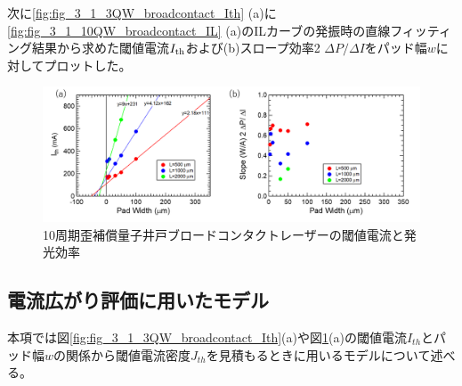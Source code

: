 次に\ref{fig:fig_3_1_3QW_broadcontact_Ith} (a)に\ref{fig:fig_3_1_10QW_broadcontact_IL} (a)のILカーブの発振時の直線フィッティング結果から求めた閾値電流$I_{\rm{th}}$および(b)スロープ効率2 $\Delta P/\Delta I$をパッド幅$w$に対してプロットした。
\begin{figure}[h]
	\centering
	\includegraphics[width=15cm]{figure/fig_3_1_10QW_broadcontact_Ith.png}
		\caption{10周期歪補償量子井戸ブロードコンタクトレーザーの閾値電流と発光効率}
		\label{fig:fig_3_1_10QW_broadcontact_Ith}
\end{figure}
\subsection{電流広がり評価に用いたモデル}%
本項では図\ref{fig:fig_3_1_3QW_broadcontact_Ith}(a)や図\ref{fig:fig_3_1_10QW_broadcontact_Ith}(a)の閾値電流$I_{th}$とパッド幅$w$の関係から閾値電流密度$J_{th}$を見積もるときに用いるモデルについて述べる。

